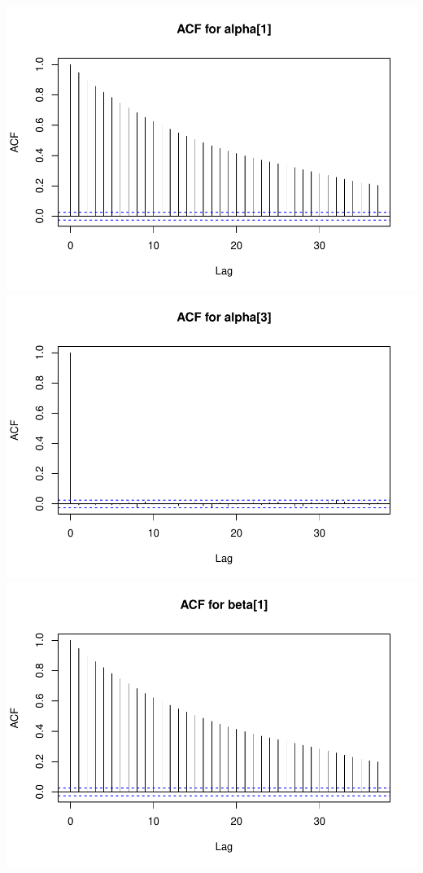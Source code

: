 \documentclass[
  11pt,
]{article}
\begin{document}
\includegraphics{Final-Project_files/figure-latex/appendix-code-2-11.pdf}
\includegraphics{Final-Project_files/figure-latex/appendix-code-2-12.pdf}
\includegraphics{Final-Project_files/figure-latex/appendix-code-2-13.pdf}
\end{document}
